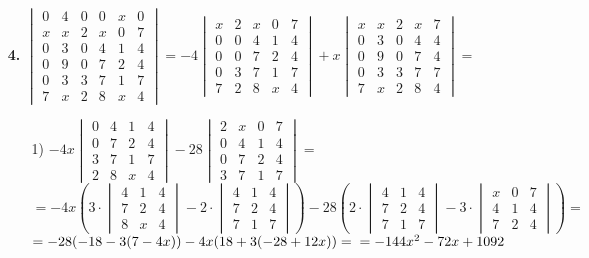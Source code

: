 \documentclass[a4paper]{article}
\renewcommand{\det}[1]{\begin{vmatrix} #1 \end{vmatrix}}
\begin{document}
\begin{enumerate}
    \item[\textbf{4.}]
    $\det{0 & 4 & 0 & 0 & x & 0 \\
    x & x & 2 & x & 0 & 7 \\ 
    0 & 3 & 0 & 4 & 1 & 4 \\
    0 &9 & 0 & 7 &2 & 4 \\
    0 & 3 & 3 & 7 & 1 & 7 \\
    7 & x & 2 & 8 & x & 4} = -4\det{x & 2 & x & 0 & 7 \\ 0 & 0 & 4 & 1 & 4 \\ 0 & 0 & 7 & 2 & 4 \\ 0 & 3 & 7 & 1 & 7 \\ 7 & 2 & 8 & x & 4} + x \det{x & x & 2 & x & 7 \\ 0 & 3 & 0 & 4 & 4 \\ 0 & 9 & 0 & 7 & 4 \\ 0 & 3 & 3 & 7 & 7 \\ 7 & x & 2 & 8 & 4} =$\\
    \begin{enumerate}
        \item[1)]$-4x\det{0 & 4 & 1 & 4 \\ 0 & 7 & 2 & 4 \\ 3 & 7 & 1 & 7 \\ 2 & 8 & x & 4} -28\det{2 & x & 0 & 7 \\ 0 & 4 & 1 & 4 \\ 0 & 7 & 2 & 4 \\ 3 & 7 & 1 & 7} = $\\
        $= -4x \left(3 \cdot  \begin{vmatrix} 4 & 1 & 4 \\ 7 & 2 & 4 \\ 8 & x & 4 \end{vmatrix} - 2 \cdot \begin{vmatrix} 4 & 1 & 4 \\ 7 & 2 & 4 \\ 7 & 1 & 7 \end{vmatrix} \right) -28 \left( 2 \cdot\begin{vmatrix} 4 & 1 & 4 \\ 7 & 2 & 4 \\ 7 & 1 & 7 \end{vmatrix}- 3 \cdot \begin{vmatrix} x & 0 & 7 \\ 4 & 1 & 4 \\ 7 & 2 & 4 \end{vmatrix} \right) = $\\
        $= -28(-18 - 3(7 - 4x)) - 4x(18 + 3(-28 + 12x)) =\\ = -144x^2-72x+1092$


\end{enumerate}
\end{enumerate}
\end{document}
